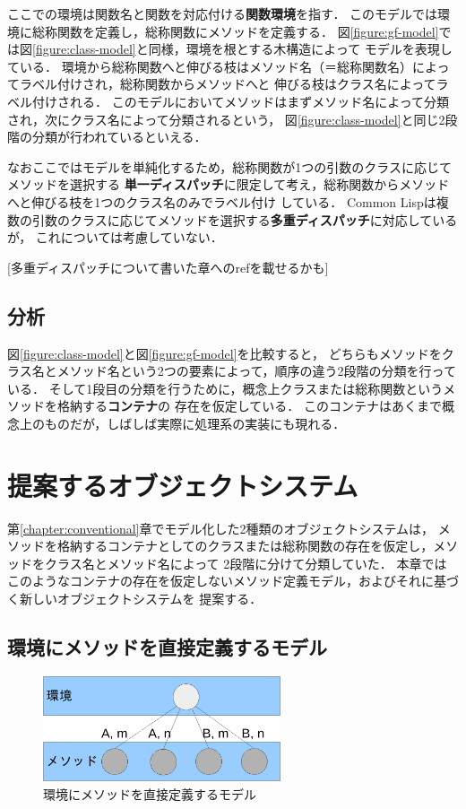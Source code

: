 \documentclass[a4paper,11pt,dvipdfmx]{jreport}
\begin{document}
ここでの環境は関数名と関数を対応付ける\textbf{関数環境}を指す．
このモデルでは環境に総称関数を定義し，総称関数にメソッドを定義する．
図\ref{figure:gf-model}では図\ref{figure:class-model}と同様，環境を根とする木構造によって
モデルを表現している．
環境から総称関数へと伸びる枝はメソッド名（＝総称関数名）によってラベル付けされ，総称関数からメソッドへと
伸びる枝はクラス名によってラベル付けされる．
このモデルにおいてメソッドはまずメソッド名によって分類され，次にクラス名によって分類されるという，
図\ref{figure:class-model}と同じ2段階の分類が行われているといえる．

なおここではモデルを単純化するため，総称関数が1つの引数のクラスに応じてメソッドを選択する
\textbf{単一ディスパッチ}に限定して考え，総称関数からメソッドへと伸びる枝を1つのクラス名のみでラベル付け
している．
Common Lispは複数の引数のクラスに応じてメソッドを選択する\textbf{多重ディスパッチ}に対応しているが，
これについては考慮していない．

[多重ディスパッチについて書いた章へのrefを載せるかも]

\section{分析}

図\ref{figure:class-model}と図\ref{figure:gf-model}を比較すると，
どちらもメソッドをクラス名とメソッド名という2つの要素によって，順序の違う2段階の分類を行っている．
そして1段目の分類を行うために，概念上クラスまたは総称関数というメソッドを格納する\textbf{コンテナ}の
存在を仮定している．
このコンテナはあくまで概念上のものだが，しばしば実際に処理系の実装にも現れる．


\chapter{提案するオブジェクトシステム}

第\ref{chapter:conventional}章でモデル化した2種類のオブジェクトシステムは，
メソッドを格納するコンテナとしてのクラスまたは総称関数の存在を仮定し，メソッドをクラス名とメソッド名によって
2段階に分けて分類していた．
本章ではこのようなコンテナの存在を仮定しないメソッド定義モデル，およびそれに基づく新しいオブジェクトシステムを
提案する．

\section{環境にメソッドを直接定義するモデル}

\begin{figure}[htbp]
	\centering
	\includegraphics[width=7cm]{fig/trees_containerless-crop.pdf}
	\caption{環境にメソッドを直接定義するモデル}
	\label{figure:containerlsss-model}
\end{figure}
\end{document}
